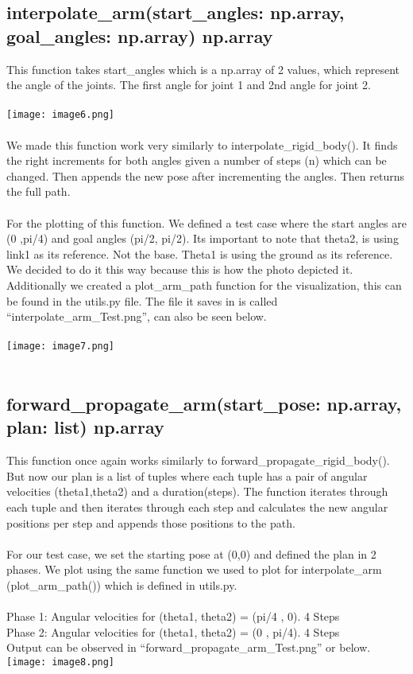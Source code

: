\documentclass[12pt]{article}
\begin{document}
\subsection*{interpolate\_arm(start\_angles: np.array, goal\_angles: np.array) \rightarrow{} np.array}
This function takes start\_angles which is a np.array of 2 values, which represent the angle of the joints. The first angle for joint 1 and 2nd angle for joint 2.
\\ \\
\texttt{[image: image6.png]} \\ \\
We made this function work very similarly to interpolate\_rigid\_body(). It finds the right increments for both angles given a number of steps (n) which can be changed. Then appends the new pose after incrementing the angles. Then returns the full path.
\\ \\
For the plotting of this function. We defined a test case where the start angles are (0 ,pi/4) and goal angles (pi/2, pi/2). Its important to note that theta2, is using link1 as its reference. Not the base. Theta1 is using the ground as its reference. We decided to do it this way because this is how the photo depicted it. Additionally we created a plot\_arm\_path function for the visualization, this can be found in the utils.py file. The file it saves in is called “interpolate\_arm\_Test.png”, can also be seen below.
\\ \\
\texttt{[image: image7.png]} \\ \\

\subsection*{forward\_propagate\_arm(start\_pose: np.array, plan: list) \rightarrow{} np.array}
This function once again works similarly to forward\_propagate\_rigid\_body(). But now our plan is a list of tuples where each tuple has a pair of angular velocities (theta1,theta2) and a duration(steps). The function iterates through each tuple and then iterates through each step and calculates the new angular positions per step and appends those positions to the path.
\\ \\
For our test case, we set the starting pose at (0,0) and defined the plan in 2 phases. We plot using the same function we used to plot for interpolate\_arm (plot\_arm\_path()) which is defined in utils.py.
\\ \\
Phase 1: Angular velocities for (theta1, theta2) = (pi/4 , 0). 4 Steps \\
Phase 2: Angular velocities for (theta1, theta2) = (0 , pi/4). 4 Steps \\
Output can be observed in “forward\_propagate\_arm\_Test.png” or below. \\
\texttt{[image: image8.png]} \\ \\
\end{document}
